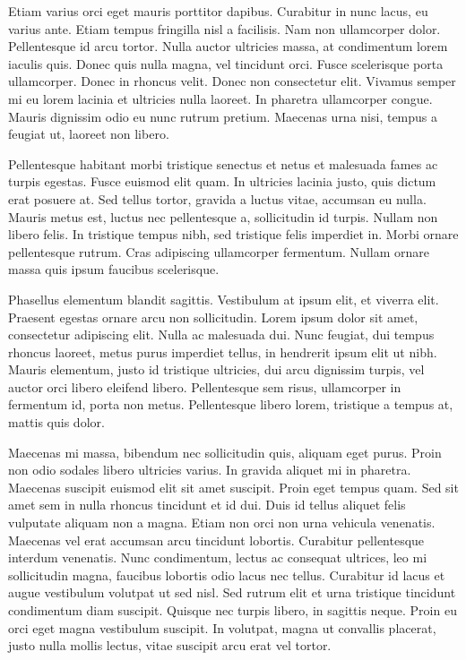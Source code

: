 \documentclass[a4paper]{article}
\begin{document}
Etiam varius orci eget mauris porttitor dapibus. Curabitur in nunc lacus, eu varius ante. Etiam tempus fringilla nisl a facilisis. Nam non ullamcorper dolor. Pellentesque id arcu tortor. Nulla auctor ultricies massa, at condimentum lorem iaculis quis. Donec quis nulla magna, vel tincidunt orci. Fusce scelerisque porta ullamcorper. Donec in rhoncus velit. Donec non consectetur elit. Vivamus semper mi eu lorem lacinia et ultricies nulla laoreet. In pharetra ullamcorper congue. Mauris dignissim odio eu nunc rutrum pretium. Maecenas urna nisi, tempus a feugiat ut, laoreet non libero.

Pellentesque habitant morbi tristique senectus et netus et malesuada fames ac turpis egestas. Fusce euismod elit quam. In ultricies lacinia justo, quis dictum erat posuere at. Sed tellus tortor, gravida a luctus vitae, accumsan eu nulla. Mauris metus est, luctus nec pellentesque a, sollicitudin id turpis. Nullam non libero felis. In tristique tempus nibh, sed tristique felis imperdiet in. Morbi ornare pellentesque rutrum. Cras adipiscing ullamcorper fermentum. Nullam ornare massa quis ipsum faucibus scelerisque.

Phasellus elementum blandit sagittis. Vestibulum at ipsum elit, et viverra elit. Praesent egestas ornare arcu non sollicitudin. Lorem ipsum dolor sit amet, consectetur adipiscing elit. Nulla ac malesuada dui. Nunc feugiat, dui tempus rhoncus laoreet, metus purus imperdiet tellus, in hendrerit ipsum elit ut nibh. Mauris elementum, justo id tristique ultricies, dui arcu dignissim turpis, vel auctor orci libero eleifend libero. Pellentesque sem risus, ullamcorper in fermentum id, porta non metus. Pellentesque libero lorem, tristique a tempus at, mattis quis dolor.

Maecenas mi massa, bibendum nec sollicitudin quis, aliquam eget purus. Proin non odio sodales libero ultricies varius. In gravida aliquet mi in pharetra. Maecenas suscipit euismod elit sit amet suscipit. Proin eget tempus quam. Sed sit amet sem in nulla rhoncus tincidunt et id dui. Duis id tellus aliquet felis vulputate aliquam non a magna. Etiam non orci non urna vehicula venenatis. Maecenas vel erat accumsan arcu tincidunt lobortis. Curabitur pellentesque interdum venenatis. Nunc condimentum, lectus ac consequat ultrices, leo mi sollicitudin magna, faucibus lobortis odio lacus nec tellus. Curabitur id lacus et augue vestibulum volutpat ut sed nisl. Sed rutrum elit et urna tristique tincidunt condimentum diam suscipit. Quisque nec turpis libero, in sagittis neque. Proin eu orci eget magna vestibulum suscipit. In volutpat, magna ut convallis placerat, justo nulla mollis lectus, vitae suscipit arcu erat vel tortor.
\end{document}
